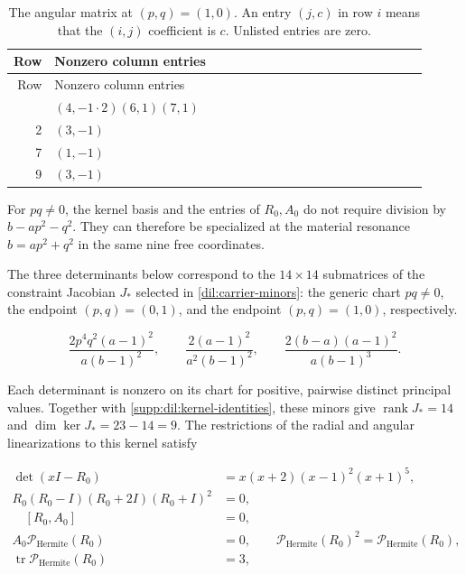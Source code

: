 \begingroup\small
\setlength{\tabcolsep}{3pt}
\renewcommand{\arraystretch}{1.16}
\begin{longtable}{@{}r>{\raggedright\arraybackslash}p{0.91\linewidth}@{}}
\caption{The angular matrix at $(p,q)=(1,0)$. An entry $(j,c)$ in row $i$ means that the $(i,j)$ coefficient is $c$. Unlisted entries are zero.}\label{supp:matrix-A_qzero}\\
\toprule Row & Nonzero column entries\\\midrule\endfirsthead
\toprule Row & Nonzero column entries\\\midrule\endhead
\bottomrule\endfoot
1 & \((4,-1 \cdot 2)\)\allowbreak\quad \((6,1)\)\allowbreak\quad \((7,1)\)\\
2 & \((3,-1)\)\\
7 & \((1,-1)\)\\
9 & \((3,-1)\)\\
\end{longtable}
\endgroup

For $pq\ne0$, the kernel basis and the entries of $R_0,A_0$ do not
require division by $b-ap^2-q^2$. They can therefore be specialized
at the material resonance $b=ap^2+q^2$ in the same nine free
coordinates.

The three determinants below correspond to the $14\times14$
submatrices of the constraint Jacobian $J_*$ selected in
\eqref{dil:carrier-minors}: the generic chart $pq\ne0$, the
endpoint $(p,q)=(0,1)$, and the endpoint $(p,q)=(1,0)$, respectively.

\begin{equation}\label{supp:dil:carrier-determinants}
 \frac{2p^4q^2(a-1)^2}{a(b-1)^2},\qquad
 \frac{2(a-1)^2}{a^2(b-1)^2},\qquad
 \frac{2(b-a)(a-1)^2}{a(b-1)^3}.
\end{equation}

Each determinant is nonzero on its chart for positive, pairwise
distinct principal values. Together with
\eqref{supp:dil:kernel-identities}, these minors give
$\operatorname{rank}J_*=14$ and $\dim\ker J_*=23-14=9$.
The restrictions of the radial and angular linearizations to this
kernel satisfy

\begin{align}\label{supp:dil:matrix-identities}
 \det(xI-R_0)&=x(x+2)(x-1)^2(x+1)^5,\\
 R_0(R_0-I)(R_0+2I)(R_0+I)^2&=0,\nonumber\\
 \quad [R_0,A_0]&=0,\nonumber\\
 A_0\mathcal P_{\mathrm{Hermite}}(R_0)&=0,\qquad \mathcal P_{\mathrm{Hermite}}(R_0)^2=\mathcal P_{\mathrm{Hermite}}(R_0),\nonumber\\
 \operatorname{tr}\mathcal P_{\mathrm{Hermite}}(R_0)&=3,\nonumber
\end{align}

